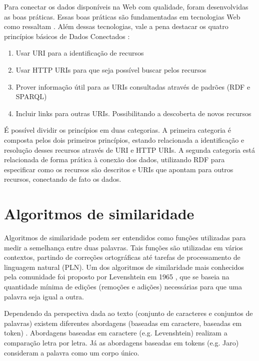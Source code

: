 Para conectar os dados disponíveis na Web com qualidade, foram desenvolvidas as boas práticas. Essas boas práticas são fundamentadas em tecnologias Web como ressaltam . Além dessas tecnologias, vale a pena destacar os quatro princípios básicos de Dados Conectados \cite{berners2006linked}: 

\begin{enumerate}
	\item Usar URI para a identificação de recursos
	\item Usar HTTP URIs para que seja possível buscar pelos recursos 
	\item Prover informação útil para as URIs consultadas através de padrões (RDF e SPARQL) 
	\item Incluir links para outras URIs. Possibilitando a descoberta de novos recursos
\end{enumerate}

É possível dividir os princípios em duas categorias. A primeira categoria é composta pelos dois primeiros princípios, estando relacionada a identificação e resolução desses recursos através de URI e HTTP URIs. A segunda categoria está relacionada de forma prática à conexão dos dados, utilizando RDF para especificar como os recursos são descritos e URIs que apontam para outros recursos, conectando de fato os dados.

\section{Algoritmos de similaridade}

Algoritmos de similaridade podem ser entendidos como funções utilizadas para medir a semelhança entre duas palavras. Tais funções são utilizadas em vários contextos, partindo de correções ortográficas até tarefas de processamento de linguagem natural (PLN). Um dos algoritmos de similaridade mais conhecidos pela comunidade foi proposto por Levenshtein em 1965 \cite{levenshtein1966binary}, que se baseia na quantidade mínima de edições (remoções e adições) necessárias para que uma palavra seja igual a outra.  

Dependendo da perspectiva dada ao texto (conjunto de caracteres e conjuntos de palavras) existem diferentes abordagens (baseadas em caractere, baseadas em token) \cite{cohen2003comparison}. Abordagens baseadas em caractere (e.g. Levenshtein) realizam a comparação letra por letra. Já as abordagens baseadas em tokens (e.g. Jaro)  consideram a palavra como um corpo único.

